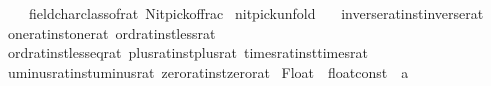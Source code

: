 \begin{isabellebody}
\ \ \ \ \ {\isacharparenleft}{\kern0pt}\isactrlconstUNDERSCOREname {\isasymopen}field{\isacharunderscore}{\kern0pt}char{\isacharunderscore}{\kern0pt}{}{\isacharunderscore}{\kern0pt}class{\isachardot}{\kern0pt}of{\isacharunderscore}{\kern0pt}rat{\isasymclose}{\isacharcomma}{\kern0pt}\ \isactrlconstUNDERSCOREname {\isasymopen}Nitpick{\isachardot}{\kern0pt}of{\isacharunderscore}{\kern0pt}frac{\isasymclose}{\isacharparenright}{\kern0pt}{\isacharbrackright}{\kern0pt}\isanewline
{\isacartoucheclose}%
\endisatagML
{\isafoldML}%
%
\isadelimML
%
\endisadelimML
\isanewline
\isanewline
{}\isamarkupfalse%
\ {\isacharbrackleft}{\kern0pt}nitpick{\isacharunderscore}{\kern0pt}unfold{\isacharbrackright}{\kern0pt}\ {\isacharequal}{\kern0pt}\isanewline
\ \ inverse{\isacharunderscore}{\kern0pt}rat{\isacharunderscore}{\kern0pt}inst{\isachardot}{\kern0pt}inverse{\isacharunderscore}{\kern0pt}rat\isanewline
\ \ one{\isacharunderscore}{\kern0pt}rat{\isacharunderscore}{\kern0pt}inst{\isachardot}{\kern0pt}one{\isacharunderscore}{\kern0pt}rat\ ord{\isacharunderscore}{\kern0pt}rat{\isacharunderscore}{\kern0pt}inst{\isachardot}{\kern0pt}less{\isacharunderscore}{\kern0pt}rat\isanewline
\ \ ord{\isacharunderscore}{\kern0pt}rat{\isacharunderscore}{\kern0pt}inst{\isachardot}{\kern0pt}less{\isacharunderscore}{\kern0pt}eq{\isacharunderscore}{\kern0pt}rat\ plus{\isacharunderscore}{\kern0pt}rat{\isacharunderscore}{\kern0pt}inst{\isachardot}{\kern0pt}plus{\isacharunderscore}{\kern0pt}rat\ times{\isacharunderscore}{\kern0pt}rat{\isacharunderscore}{\kern0pt}inst{\isachardot}{\kern0pt}times{\isacharunderscore}{\kern0pt}rat\isanewline
\ \ uminus{\isacharunderscore}{\kern0pt}rat{\isacharunderscore}{\kern0pt}inst{\isachardot}{\kern0pt}uminus{\isacharunderscore}{\kern0pt}rat\ zero{\isacharunderscore}{\kern0pt}rat{\isacharunderscore}{\kern0pt}inst{\isachardot}{\kern0pt}zero{\isacharunderscore}{\kern0pt}rat%
\isadelimdocument
%
\endisadelimdocument
%
\isatagdocument
%
\isamarkuptrue%
%
\endisatagdocument
{\isafolddocument}%
%
\isadelimdocument
%
\endisadelimdocument
{}\isamarkupfalse%
\ {\isachardoublequoteopen}{\isacharunderscore}{\kern0pt}Float{\isachardoublequoteclose}\ {\isacharcolon}{\kern0pt}{\isacharcolon}{\kern0pt}\ {\isachardoublequoteopen}float{\isacharunderscore}{\kern0pt}const\ {\isasymRightarrow}\ {\isacharprime}{\kern0pt}a{\isachardoublequoteclose}\ \ \ \ {\isacharparenleft}{\kern0pt}{\isachardoublequoteopen}{\isacharunderscore}{\kern0pt}{\isachardoublequoteclose}{\isacharparenright}{\kern0pt}\isanewline
%

\end{isabellebody}
